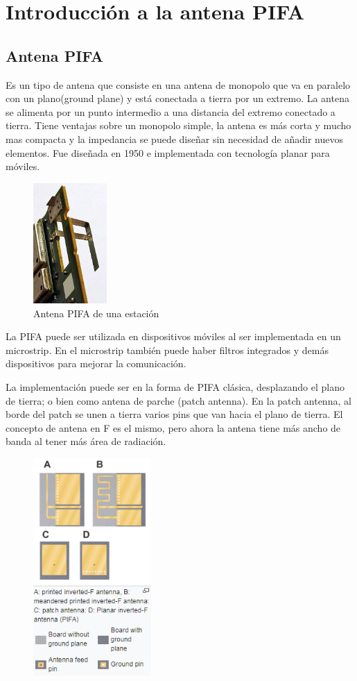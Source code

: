 \documentclass[a4paper,11pt,titlepage]{article}
\begin{document}
\section{Introducción a la antena PIFA}
\subsection{Antena PIFA}
Es un tipo de antena que consiste en una antena de monopolo que va en paralelo con un plano(ground plane) y está conectada a tierra por un extremo. La antena se alimenta por un punto intermedio a una distancia del extremo conectado a tierra. Tiene ventajas sobre un monopolo simple, la antena es más corta y mucho mas compacta y la impedancia se puede diseñar sin necesidad de añadir nuevos elementos. Fue diseñada en 1950 e implementada con tecnología planar para móviles.
\begin{figure}[H]
\centering
\includegraphics[width=0.25\textwidth]{pifawiki}
\caption{Antena PIFA de una estación}
\end{figure}
La PIFA puede ser utilizada en dispositivos móviles al ser implementada en un microstrip. En el microstrip también puede haber filtros integrados y demás dispositivos para mejorar la comunicación.\par
La implementación puede ser en la forma de PIFA clásica, desplazando el plano de tierra; o bien como antena de parche (patch antenna). En la patch antenna, al borde del patch se unen a tierra varios pins que van hacia el plano de tierra. El concepto de antena en F es el mismo, pero ahora la antena tiene más ancho de banda al tener más área de radiación. 
\begin{figure}[H]
\centering
\includegraphics[width=0.4\textwidth]{pifaplanar}
\end{figure}
\end{document}
